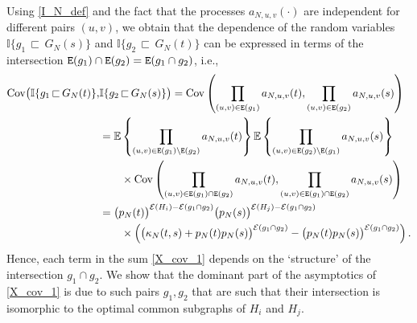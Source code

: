 \documentclass[11pt,reqno]{amsart}
\numberwithin{equation}{section}
\newcommand{\E}[1]{\mathbb{E}\left\{ #1\right\}}
\begin{document}
 Using  \eqref{I_N_def} and the fact that the processes {$a_{N,u,v}(\cdot)$} are independent for different pairs $(u,v)$, we obtain that the dependence of the random variables $\mathbb{I}\{g_1{\,\sqsubset\,} G_N(s)\}$ and $\mathbb{I}\{g_2{\,\sqsubset\,} G_N(t)\}$ can be expressed in terms of the intersection ${\tt E}(g_1)\cap {\tt E}(g_2) = {\tt E}(g_1\cap g_2)$, i.e.,
\begin{align}
    \operatorname{Cov}\bigl(\mathbb{I}\{g_1{\,\sqsubset\,} G_N(t)\}, &\mathbb{I}\{g_2{\,\sqsubset\,} G_N(s)\}\bigr) = \operatorname{Cov}\left(\prod_{(u,v)\in{\tt E}(g_1)}a_{N,u,v}(t), \prod_{(u,v)\in{\tt E}(g_2)}a_{N,u,v}(s)\right)\notag\\
    &= \E{\prod_{(u,v)\in{\tt E}(g_1)\setminus {\tt E}(g_2)}a_{N,u,v}(t)}\E{\prod_{(u,v)\in{\tt E}(g_2)\setminus {\tt E}(g_1)}a_{N,u,v}({s})}\notag\\
    &\qquad\times\operatorname{Cov}\left(\prod_{(u,v)\in{\tt E}(g_1)\cap{\tt E}(g_2)}a_{N,u,v}(t), \prod_{(u,v)\in{\tt E}(g_1)\cap {\tt E}(g_2)}a_{N,u,v}(s)\right)\notag\\
    &= \bigl(p_N(t)\bigr)^{\mathcal{E}({H}_i) - \mathcal{E}(g_1\cap g_2)}\bigl(p_N(s)\bigr)^{\mathcal{E}({H}_j) - \mathcal{E}(g_1\cap g_2)}\notag\\
    &\qquad\times\left( \bigl(\kappa_N(t,s) + p_N(t)p_N(s)\bigr)^{\mathcal{E}(g_1\cap g_2)} - \bigl(p_N(t)p_N(s)\bigr)^{\mathcal{E}(g_1\cap g_2)}\right).\label{X_cov_2}
\end{align}
{Hence, each term in the sum \eqref{X_cov_1} depends on the `structure' of the intersection $g_1\cap g_2$. We show that the dominant part of the asymptotics of \eqref{X_cov_1} is due to such pairs $g_1,g_2$ that are such that their intersection is isomorphic to {the optimal common subgraphs of $H_i$ and $H_j$}.} 
\end{document}
